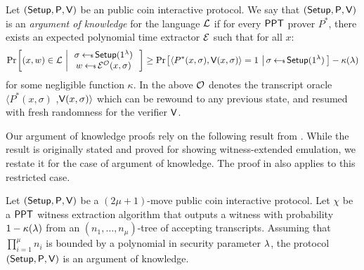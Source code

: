 \begin{definition}\label{def:argofknowledge}
Let $(\mathsf{Setup},\mathsf{P},\mathsf{V})$ be an public coin interactive protocol. We say that
$(\mathsf{Setup},\mathsf{P},\mathsf{V})$ is an {\em argument of knowledge} for the language
$\mathcal{L}$ if for every $\mathsf{PPT}$
prover $P^\ast$, there exists an expected polynomial time extractor $\mathcal{E}$ such that for all $x$:
\small
\begin{align}
\condprob{(x,w)\in \mc{L}}{
\begin{array}{c}
\sigma\sample\setup(\secparam) \\
w\sample \extr^{\mc{O}}(x,\sigma)
\end{array}
}
\geq \condprob{\langle
P^\ast(x,\sigma),\verifier(x,\sigma)\rangle=1}{\sigma\sample \setup(\secparam)} -
\kappa(\lambda)
\end{align}
for some negligible function $\kappa$. In the above $\mathcal{O}$ denotes the transcript oracle  $\langle P^\ast(x,\sigma)$ ,$\mathsf{V}(x,\sigma)\rangle$ which can be rewound to any previous state, and resumed with fresh randomness for the
verifier $\mathsf{V}$.
\end{definition}

Our argument of knowledge proofs rely on the following result from \cite{bulletproofs}.
While the result is originally stated and proved for showing witness-extended
emulation, we restate it for the case of argument of knowledge. The proof in
\cite{InnerProductDLS} also applies to this restricted case.

\begin{lemma}\label{lem:forkinglemma}
Let $(\mathsf{Setup},\mathsf{P},\mathsf{V})$ be a $(2\mu+1)$-move public coin interactive
protocol. Let $\chi$ be a $\mathsf{PPT}$ witness extraction algorithm that outputs a
witness with probability $1-\kappa(\lambda)$ from an $(n_1,\ldots,n_\mu)$-tree
of accepting transcripts. Assuming that $\prod_{i=1}^\mu n_i$ is bounded by a
polynomial in security parameter $\lambda$, the protocol
$(\mathsf{Setup},\mathsf{P},\mathsf{V})$ is an argument of knowledge.
\end{lemma}


